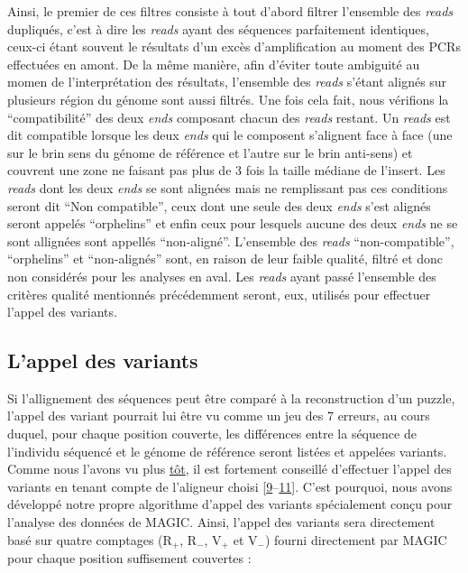 \documentclass[12pt,twoside]{reedthesis}
\theoremstyle{definition}
\theoremstyle{definition}
\theoremstyle{remark}
\begin{document}
  Ainsi, le premier de ces filtres consiste à tout d'abord filtrer
  l'ensemble des \emph{reads} dupliqués, c'est à dire les \emph{reads}
  ayant des séquences parfaitement identiques, ceux-ci étant souvent le
  résultats d'un excès d'amplification au moment des PCRs effectuées en
  amont. De la même manière, afin d'éviter toute ambiguité au momen de
  l'interprétation des résultats, l'ensemble des \emph{reads} s'étant
  alignés sur plusieurs région du génome sont aussi filtrés. Une fois cela
  fait, nous vérifions la ``compatibilité'' des deux \emph{ends} composant
  chacun des \emph{reads} restant. Un \emph{reads} est dit compatible
  lorsque les deux \emph{ends} qui le composent s'alignent face à face
  (une sur le brin sens du génome de référence et l'autre sur le brin
  anti-sens) et couvrent une zone ne faisant pas plus de 3 fois la taille
  médiane de l'insert. Les \emph{reads} dont les deux \emph{ends} se sont
  alignées mais ne remplissant pas ces conditions seront dit ``Non
  compatible'', ceux dont une seule des deux \emph{ends} s'est alignés
  seront appelés ``orphelins'' et enfin ceux pour lesquels aucune des deux
  \emph{ends} ne se sont allignées sont appellés ``non-aligné''.
  L'ensemble des \emph{reads} ``non-compatible'', ``orphelins'' et
  ``non-alignés'' sont, en raison de leur faible qualité, filtré et donc
  non considérés pour les analyses en aval. Les \emph{reads} ayant passé
  l'ensemble des critères qualité mentionnés précédemment seront, eux,
  utilisés pour effectuer l'appel des variants.
  
  \newpage
  
  \subsection{L'appel des variants}\label{lappel-des-variants}
  
  Si l'allignement des séquences peut être comparé à la reconstruction
  d'un puzzle, l'appel des variant pourrait lui être vu comme un jeu des 7
  erreurs, au cours duquel, pour chaque position couverte, les différences
  entre la séquence de l'individu séquencé et le génome de référence
  seront listées et appelées variants. Comme nous l'avons vu plus
  \protect\hyperlink{varcall}{tôt}, il est fortement conseillé d'effectuer
  l'appel des variants en tenant compte de l'aligneur choisi
  {[}\protect\hyperlink{ref-Nielsen2011}{9}--\protect\hyperlink{ref-Lunter2011}{11}{]}.
  C'est pourquoi, nous avons développé notre propre algorithme d'appel des
  variants spécialement conçu pour l'analyse des données de MAGIC. Ainsi,
  l'appel des variants sera directement basé sur quatre comptages
  (R\(_+\), R\(_-\), V\(_+\) et V\(_-\)) fourni directement par MAGIC pour
  chaque position suffisement couvertes :
  
\end{document}

